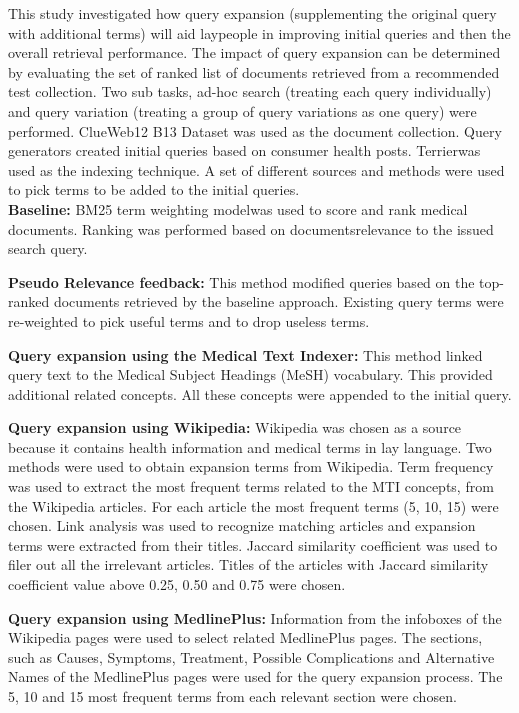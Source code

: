 \documentclass[]{article}
\begin{document}
\begin{enumerate}
This study investigated how query expansion (supplementing the original query with additional terms) will aid laypeople in improving initial queries and then the overall retrieval performance. The impact of query expansion can be determined by evaluating the set of ranked list of documents retrieved from a recommended test collection. Two sub tasks, ad-hoc search (treating each query individually) and query variation (treating a group of query variations as one query) were performed. ClueWeb12 B13 Dataset was used as the document collection. Query generators created initial queries based on consumer health posts. \textquotesingle Terrier\textquotesingle was used as the indexing technique. A set of different sources and methods were used to pick terms to be added to the initial queries. \\        

\textbf{Baseline:} \textquotesingle BM25 term weighting model\textquotesingle was used to score and rank medical documents. Ranking was performed based on documents\textquotesingle relevance to the issued search query. 

\textbf{Pseudo Relevance feedback:} This method modified queries based on the top-ranked documents retrieved by the baseline approach. Existing query terms were re-weighted to pick useful terms and to drop useless terms. 

\textbf{Query expansion using the Medical Text Indexer:} This method linked query text to the Medical Subject Headings (MeSH) vocabulary. This provided additional related concepts. All these concepts were appended to the initial query.  

\textbf{Query expansion using Wikipedia:} Wikipedia was chosen as a source because it contains health information and medical terms in lay language. Two methods were used to obtain expansion terms from Wikipedia. Term frequency was used to extract the most frequent terms related to the MTI concepts, from the Wikipedia articles. For each article the most frequent terms (5, 10, 15) were chosen. Link analysis was used to recognize matching articles and expansion terms were extracted from their titles. Jaccard similarity coefficient was used to filer out all the irrelevant articles. Titles of the articles with Jaccard similarity coefficient value above 0.25, 0.50 and 0.75 were chosen.             

\textbf{Query expansion using MedlinePlus:} Information from the infoboxes of the Wikipedia pages were used to select related MedlinePlus pages. The sections, such as Causes, Symptoms, Treatment, Possible Complications and Alternative Names of the MedlinePlus pages were used for the query expansion process. The 5, 10 and 15 most frequent terms from each relevant section were chosen.       


\end{enumerate}
\end{document}
